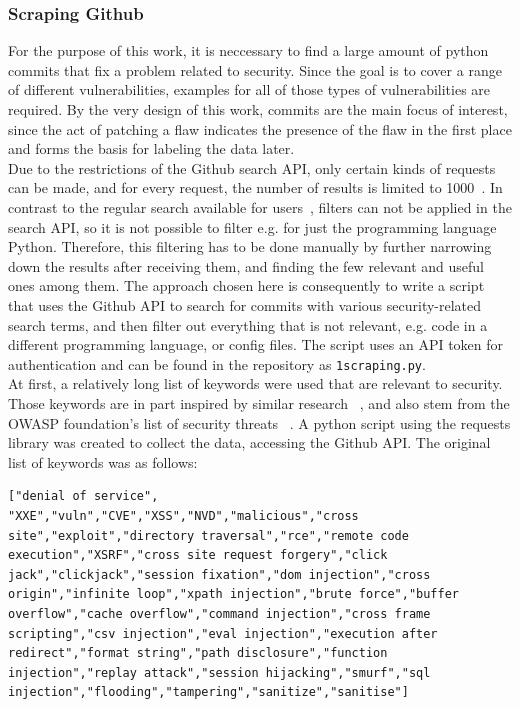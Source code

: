 \documentclass[
	a4paper,
	pagesize,
	pdftex,
	12pt,
	twoside, %
	BCOR=5mm, %
	ngerman,
	fleqn,
	final,
	]{scrartcl}
\begin{document}
\subsubsection{Scraping Github}
For the purpose of this work, it is neccessary to find a large amount of python commits that fix a problem related to security. Since the goal is to cover a range of different vulnerabilities, examples for all of those types of vulnerabilities are required. By the very design of this work, commits are the main focus of interest, since the act of patching a flaw indicates the presence of the flaw in the first place and forms the basis for labeling the data later.\\	
Due to the restrictions of the Github search API, only certain kinds of requests can be made, and for every request, the number of results is limited to 1000~\cite{Github.com.2}. In contrast to the regular search available for users~\cite{Github.com.2019}, filters can not be applied in the search API, so it is not possible to filter e.g. for just the programming language Python. Therefore, this filtering has to be done manually by further narrowing down the results after receiving them, and finding the few relevant and useful ones among them.
The approach chosen here is consequently to write a script that uses the Github API to search for commits with various security-related search terms, and then filter out everything that is not relevant, e.g. code in a different programming language, or config files. The script uses an API token for authentication and can be found in the repository as \texttt{1scraping.py}.\\
At first, a relatively long list of keywords were used that are relevant to security. Those keywords are in part inspired by similar research ~\cite{Zhou.2017}, and also stem from the OWASP foundation's list of security threats ~\cite{OWASPFoundation.}. A python script using the requests library was created to collect the data, accessing the Github API. The original list of keywords was as follows:
\lstset{basicstyle=\small}
\begin{lstlisting}
["denial of service", "XXE","vuln","CVE","XSS","NVD","malicious","cross site","exploit","directory traversal","rce","remote code execution","XSRF","cross site request forgery","click jack","clickjack","session fixation","dom injection","cross origin","infinite loop","xpath injection","brute force","buffer overflow","cache overflow","command injection","cross frame scripting","csv injection","eval injection","execution after redirect","format string","path disclosure","function injection","replay attack","session hijacking","smurf","sql injection","flooding","tampering","sanitize","sanitise"]
\end{lstlisting}
\end{document}
